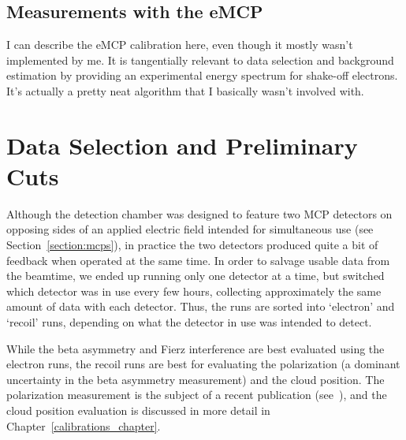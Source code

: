 \subsection{Measurements with the eMCP}
	I can describe the eMCP calibration here, even though it mostly wasn't implemented by me.  It is tangentially relevant to data selection and background estimation by providing an experimental energy spectrum for shake-off electrons.  It's actually a pretty neat algorithm that I basically wasn't involved with.





\section{Data Selection and Preliminary Cuts}
Although the detection chamber was designed to feature two MCP detectors on opposing sides of an applied electric field intended for simultaneous use (see Section~\ref{section:mcps}), in practice the two detectors produced quite a bit of feedback when operated at the same time.  In order to salvage usable data from the beamtime, we ended up running only one detector at a time, but switched which detector was in use every few hours, collecting approximately the same amount of data with each detector.  Thus, the runs are sorted into `electron' and `recoil' runs, depending on what the detector in use was intended to detect.  

While the beta asymmetry and Fierz interference are best evaluated using the electron runs, the recoil runs are best for evaluating the polarization (a dominant uncertainty in the beta asymmetry measurement) and the cloud position.  The polarization measurement is the subject of a recent publication (see~\cite{ben_OP}), and the cloud position evaluation is discussed in more detail in Chapter~\ref{calibrations_chapter}.

